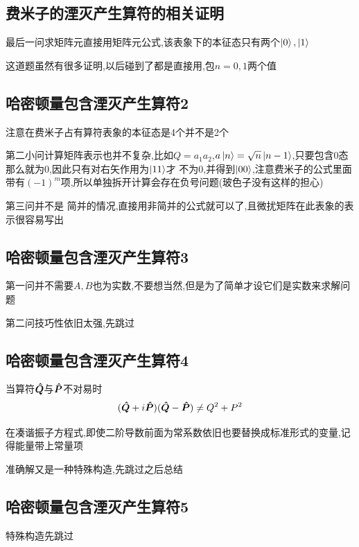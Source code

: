         \subsection{费米子的湮灭产生算符的相关证明}
            最后一问求矩阵元直接用矩阵元公式,该表象下的本征态只有两个$\ket{0} , \ket{1}$

            这道题虽然有很多证明,以后碰到了都是直接用,包$n=0,1$两个值


        \subsection{哈密顿量包含湮灭产生算符2}
            注意在费米子占有算符表象的本征态是4个并不是2个

            第二小问计算矩阵表示也并不复杂,比如$Q=a_{1}a_{2}$,$a\ket{n} = \sqrt{n} \ket{n-1}$,只要包含0态那么就为0,因此只有对右矢作用为$\ket{11}$才
            不为0,并得到$\ket{00}$,注意费米子的公式里面带有$(-1)^{m}$项,所以单独拆开计算会存在负号问题(玻色子没有这样的担心)

            第三问并不是 简并的情况,直接用非简并的公式就可以了,且微扰矩阵在此表象的表示很容易写出                  

        \subsection{哈密顿量包含湮灭产生算符3}
            第一问并不需要$A,B$也为实数,不要想当然,但是为了简单才设它们是实数来求解问题

            第二问技巧性依旧太强,先跳过

        \subsection{哈密顿量包含湮灭产生算符4}
            当算符$\vu*{Q}$与$\vu*{P}$不对易时
            $$
            (\vu*{Q} + i\vu*{P}) (\vu*{Q} - \vu*{P}) \neq Q^{2} + P^{2}
            $$

            在凑谐振子方程式,即使二阶导数前面为常系数依旧也要替换成标准形式的变量,记得能量带上常量项

            准确解又是一种特殊构造,先跳过之后总结 

        \subsection{哈密顿量包含湮灭产生算符5}
            特殊构造先跳过

